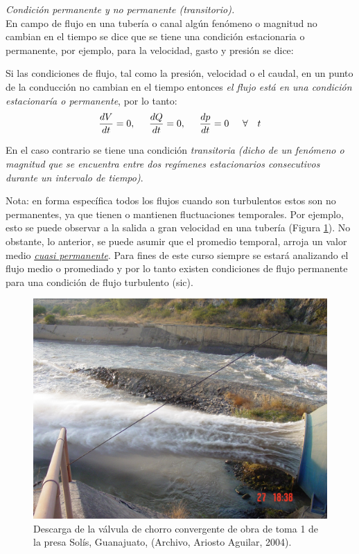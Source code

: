 \documentclass[letterpaper]{report}
\begin{document}
\emph{Condición permanente y no permanente (transitorio).}\\
En campo de flujo en una tubería o canal algún fenómeno o magnitud no cambian en el tiempo se dice que se 
tiene una condición estacionaria o permanente, por ejemplo, para la velocidad, gasto y presión se dice:\bigskip

Si las condiciones de flujo, tal como la presión, velocidad o el caudal, en un punto de la conducción no cambian
 en el tiempo entonces \emph{el flujo está en una condición estacionaría o permanente}, por lo tanto:
\begin{equation}
	\frac{dV}{dt} = 0, \hspace{0.5cm} \frac{dQ}{dt} = 0, \hspace{0.5cm} \frac{dp}{dt} = 0 \hspace{0.5cm} \forall \ \ \ t
\end{equation}

En el caso contrario se tiene una condición \emph{transitoria (dicho de un fenómeno o magnitud que se encuentra entre 
dos regímenes estacionarios consecutivos durante un intervalo de tiempo)}.\bigskip

Nota: en forma específica todos los flujos cuando son turbulentos estos son no permanentes, ya que tienen o 
mantienen fluctuaciones temporales. Por ejemplo, esto se puede observar a la salida a gran velocidad en una 
tubería (Figura \ref{fig:fig11}). No obstante, lo anterior, se puede asumir que el promedio temporal, arroja un valor 
medio \emph{\underline{cuasi permanente}}. Para fines de este curso siempre se estará analizando el flujo medio o promediado y 
por lo tanto existen condiciones de flujo permanente para una condición de flujo turbulento (sic).\bigskip

\begin{figure}[H]
	\centering
	\includegraphics[width=.65\linewidth]{fig11}
	\caption{Descarga de la válvula de chorro convergente de obra de toma 1 de la presa Solís, Guanajuato, (Archivo, Ariosto Aguilar, 2004).}
	\label{fig:fig11}
\end{figure}
\end{document}
